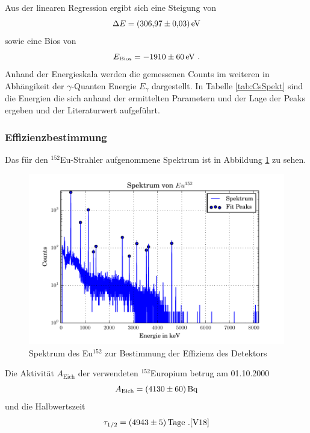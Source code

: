 Aus der linearen Regression ergibt sich eine Steigung von
\begin{equation}
  \Delta E = (\num{306,97 +- 0,03}) \, \text{eV}
  \label{eqn:Reg}
\end{equation}
sowie eine Bios von
\begin{equation}
  E_\text{Bios} = \num{-1910 +- 60} \, \text{eV} \ .
  \label{eqn:Bios}
\end{equation}
Anhand der Energieskala werden die gemessenen Counts im weiteren in Abhängikeit der $\gamma$-Quanten Energie $E_{\gamma}$ dargestellt. In Tabelle \ref{tab:CsSpekt} sind die Energien die sich anhand der ermittelten Parametern und der Lage der Peaks ergeben und der Literaturwert aufgeführt.


\subsubsection{Effizienzbestimmung}
\label{sec:Q}
Das für den $^{152}$Eu-Strahler aufgenommene Spektrum ist in Abbildung \ref{fig:SpekCs} zu sehen.
\begin{figure}[h]
  \centering
  \includegraphics[width=\textwidth]{./build/SpektEu.pdf}
   \caption{Spektrum des Eu$^{152}$ zur Bestimmung der Effizienz des Detektors}
  \label{fig:SpekCs}
\end{figure}
Die Aktivität $A_\text{Eich}$ der verwendeten $^{152}$Europium betrug am 01.10.2000
\begin{equation}
  A_\text{Eich} = (\num{4130 +- 60}) \, \text{Bq}
  \label{eqn:AktEu}
\end{equation}
und die Halbwertszeit
\begin{equation}
  \tau_{1/2} = (\num{4943 +- 5}) \, \text{Tage} \ . \text{\cite{V18}}
  \label{eqn:halb}
\end{equation}
